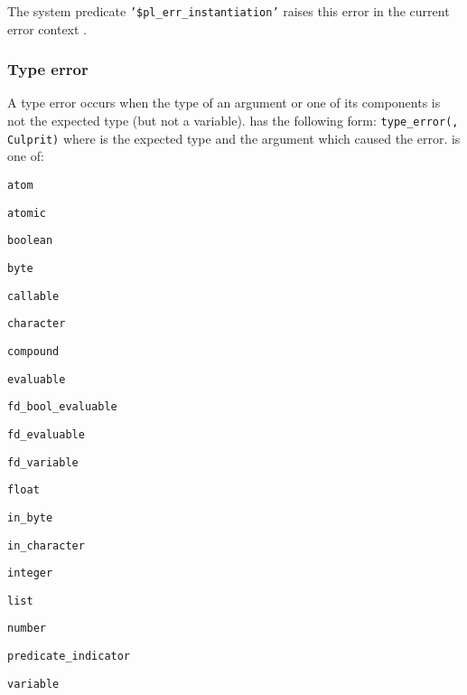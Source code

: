 The system predicate \texttt{'\$pl\_err\_instantiation'} raises this
error in the current error context .

\subsubsection{Type error}
\label{Type-error}
A type error occurs when the type of an argument or one of its components is
not the expected type (but not a variable).  has
the following form: \texttt{type\_error(, Culprit)} where
 is the expected type and 
the argument which caused the error.  is one of:

\begin{ItemizeThreeCols}

\item \texttt{atom}

\item \texttt{atomic}

\item \texttt{boolean}

\item \texttt{byte}

\item \texttt{callable}

\item \texttt{character}

\item \texttt{compound}

\item \texttt{evaluable}

\item \texttt{fd\_bool\_evaluable}

\item \texttt{fd\_evaluable}

\item \texttt{fd\_variable}

\item \texttt{float}

\item \texttt{in\_byte}

\item \texttt{in\_character}

\item \texttt{integer}

\item \texttt{list}

\item \texttt{number}

\item \texttt{predicate\_indicator}

\item \texttt{variable}

\end{ItemizeThreeCols}


